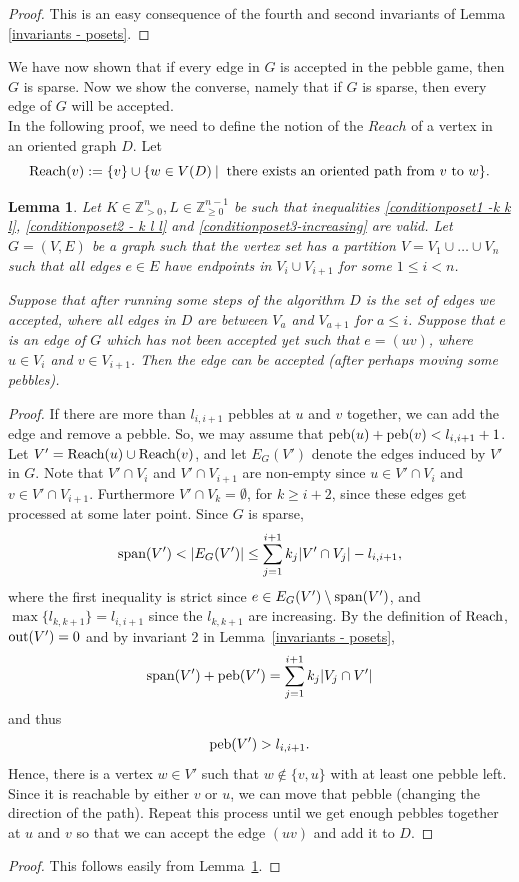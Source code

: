 \documentclass[10pt,a4paper]{article}
\newtheorem{lemma}[theorem]{Lemma}
\newcommand{\out}{\textup{out}}
\newcommand{\spa}{\textup{span}}
\newcommand{\peb}{\textup{peb}}
\begin{document}
\begin{proof}
This is an easy consequence of the fourth and second invariants of Lemma \ref{invariants - posets}.
\end{proof}

We have now shown that if every edge in $G$ is accepted in the pebble game, then $G$ is sparse. Now we show the converse, namely that if $G$ is sparse, then every edge of $G$ will be accepted.\\ In the following proof, we need to define the notion of the $Reach$ of a vertex in an oriented graph $D$. Let 
\[
\textup{Reach}(v):=\{v\} \cup \{w\in V(D) \: \vert \: \mbox{ there exists an oriented path from } v \mbox{ to } w\}.
\]




\begin{lemma}\label{lemma-add-edge(poset)}
 Let $K\in \mathbb{Z}_{>0}^{n}, L\in \mathbb{Z}_{\geq 0}^{n-1}$ be such that inequalities \eqref{conditionposet1 -k k l}, \eqref{conditionposet2 - k l l} and \eqref{conditionposet3-increasing} are valid. Let $G=(V,E)$ be a graph such that the vertex set has a partition $V=V_1\cup \dots \cup V_n$ such that all edges $e\in E$ have endpoints in $V_{i} \cup V_{i+1}$ for some $1 \leq i < n$. 
 
Suppose that after running some steps of the algorithm $D$ is the set of edges we accepted, where all edges in $D$ are between $V_a$ and $V_{a+1}$ for $a\leq i$. Suppose that $e$ is an edge of $G$ which has not been accepted yet such that $e=(uv)$, where $u\in V_i$ and $v\in V_{i+1}$. Then the edge can be accepted (after perhaps moving some pebbles).
\end{lemma}
\begin{proof}
If there are more than $l_{i, i+1}$ pebbles at $u$ and $v$ together, we can add the edge and remove a pebble. So, we may assume that $\peb(u)+\peb(v)<l_{i, i+1}+1$.
Let $V'=\textup{Reach}(u)\cup \textup{Reach}(v)$, and let $E_G(V')$ denote the edges induced by $V'$ in $G$. Note that $V'\cap V_i$ and $V'\cap  V_{i+1}$ are non-empty since $u\in V'\cap V_i$ and $v\in V'\cap V_{i+1}$. Furthermore $V'\cap V_k =\emptyset$, for $k\geq i+2$, since these edges get processed at some later point. Since $G$ is sparse, $$\spa(V')< \vert E_G(V') \vert \leq \sum_{j=1}^{i+1}k_j\vert V' \cap V_j  \vert - l_{i,i+1},$$ where the first inequality is strict since $e\in  E_G(V') \setminus \spa(V')$, and $\max\{l_{k,k+1}\}=l_{i,i+1}$ since the $l_{k,k+1}$ are increasing. By the definition of $\textup{Reach}$, $\out(V')=0$ and by invariant 2 in Lemma~\ref{invariants - posets}, 
\[
\spa(V')+ \peb(V')= \sum_{j=1}^{i+1}k_j\vert V_j \cap V' \vert
\]
and thus
\[
\peb(V') > l_{i, i+1} .
\]
Hence, there is a vertex $w\in V'$ such that $w\notin \{v,u\}$ with at least one pebble left. Since it is reachable by either $v$ or $u$, we can move that pebble (changing the direction of the path). Repeat this process until we get enough pebbles together at $u$ and $v$ so that we can accept the edge $(uv)$ and add it to $D$.
\end{proof}

\begin{proof}
This follows easily from Lemma~\ref{lemma-add-edge(poset)}.
\end{proof}



\end{document}
